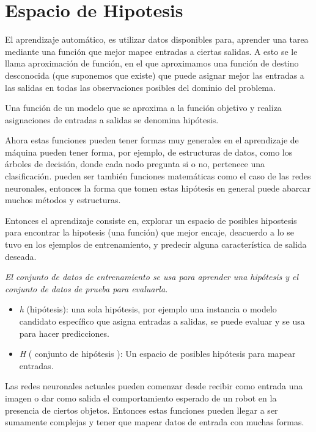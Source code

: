 \section{Espacio de Hipotesis}

El aprendizaje automático, es utilizar datos disponibles para, aprender una tarea mediante una función que mejor mapee entradas a ciertas salidas. A esto se le llama  aproximación de función, en el que aproximamos una función de destino desconocida (que suponemos que existe) que puede asignar mejor las entradas a las salidas en todas las observaciones posibles del dominio del problema.

Una función de un modelo que se aproxima a la función objetivo y realiza asignaciones de entradas a salidas se denomina hipótesis.

Ahora estas funciones pueden tener formas muy generales en el aprendizaje de máquina pueden tener forma, por ejemplo, de estructuras de datos, como los árboles de decisión, donde cada nodo pregunta si o no, pertenece una clasificación.
pueden ser también funciones matemáticas como el caso de las redes neuronales, entonces la forma que tomen estas hipótesis en general puede abarcar muchos métodos y estructuras. 

Entonces el aprendizaje consiste en, explorar un espacio de posibles hipostesis para encontrar la hipotesis (una función) que mejor encaje, deacuerdo a lo se tuvo en los ejemplos de entrenamiento, y predecir alguna característica de salida deseada.

\emph{El conjunto de datos de entrenamiento se usa para aprender una hipótesis y el conjunto de datos de prueba para evaluarla.}

\begin{itemize}
 \item \emph{h} (hipótesis): una sola hipótesis, por ejemplo una instancia o modelo candidato específico que asigna entradas a salidas, se puede evaluar y se usa para hacer predicciones.

 \item \emph{H} ( conjunto de hipótesis ): Un espacio de posibles hipótesis para mapear entradas.
 \end{itemize}

Las redes neuronales actuales pueden comenzar desde recibir como entrada una imagen o dar como salida el comportamiento esperado de un robot en la presencia de ciertos objetos. 
Entonces estas funciones pueden llegar a ser sumamente complejas y tener que mapear datos de entrada con muchas formas.

